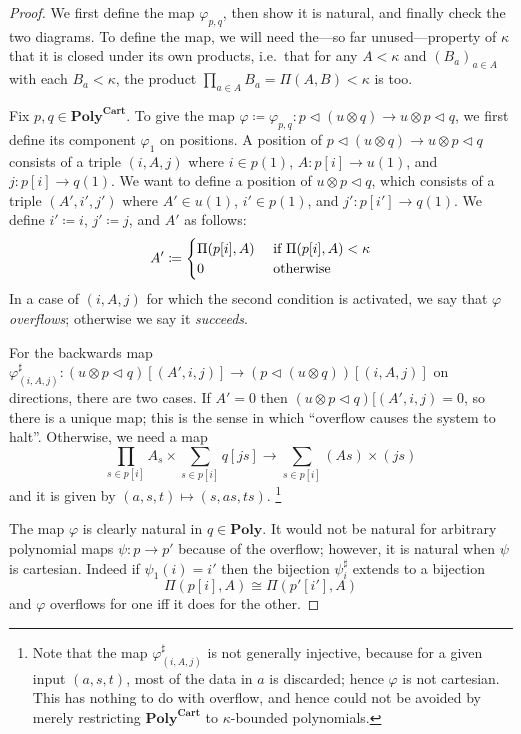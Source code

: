 \documentclass[11pt, one side, article]{memoir}
\theoremstyle{definition}
\theoremstyle{plain}
\newcommand{\Cat}[1]{\mathbf{#1}}%
\newcommand{\tn}[1]{\textnormal{#1}}
\newcommand{\poly}{\Cat{Poly}}
\newcommand{\polycart}{\poly^{\Cat{Cart}}}
\newcommand{\0}{\textsf{0}}
\newcommand{\1}{\tn{\textsf{1}}}
\newcommand{\tri}{\mathbin{\triangleleft}}
\begin{document}
\begin{proof}
We first define the map $\varphi_{p,q}$, then show it is natural, and finally check the two diagrams. To define the map, we will need the---so far unused---property of $\kappa$ that it is closed under its own products, i.e.\ that for any $A<\kappa$ and $(B_a)_{a\in A}$ with each $B_a<\kappa$, the product $\prod_{a\in A}B_a=\Pi(A,B)<\kappa$ is too.

Fix $p,q\in\polycart$. To give the map $\varphi\coloneqq\varphi_{p,q}\colon p\tri(u\otimes q)\to u\otimes p\tri q$, we first define its component $\varphi_1$ on positions. A position of $p\tri(u\otimes q)\to u\otimes p\tri q$ consists of a triple $(i,A,j)$ where $i\in p(1)$, $A\colon p[i]\to u(1)$, and $j\colon p[i]\to q(1)$. We want to define a position of $u\otimes p\tri q$, which consists of a triple $(A',i',j')$ where $A'\in u(1)$, $i'\in p(1)$, and $j'\colon p[i']\to q(1)$. We define $i'\coloneqq i$, $j'\coloneqq j$, and $A'$ as follows:
\begin{equation}\label{eqn.overflow}
  A'\coloneqq
  \begin{cases}
  	\Pi(p[i],A)&\tn{ if }\Pi(p[i],A)<\kappa\\
		0&\tn{ otherwise}
  \end{cases}
\end{equation}
In a case of $(i,A,j)$ for which the second condition is activated, we say that $\varphi$ \emph{overflows}; otherwise we say it \emph{succeeds}.

For the backwards map $\varphi^\sharp_{(i,A,j)}\colon (u\otimes p\tri q)[(A',i,j)]\to(p\tri(u\otimes q))[(i,A,j)]$ on directions, there are two cases. If $A'=0$ then $(u\otimes p\tri q)[(A',i,j)=0$, so there is a unique map; this is the sense in which ``overflow causes the system to halt''. Otherwise, we need a map
\begin{equation}\label{eqn.not_injective}
\prod_{s\in p[i]}A_s\times\sum_{s\in p[i]}q[js]\to\sum_{s\in p[i]}(A s)\times (js)
\end{equation}
and it is given by $(a,s,t)\mapsto(s,as,ts)$.%
\footnote{Note that the map $\varphi^\sharp_{(i,A,j)}$ is not generally injective, because for a given input $(a,s,t)$, most of the data in $a$ is discarded; hence $\varphi$ is not cartesian. This has nothing to do with overflow, and hence could not be avoided by merely restricting $\polycart$ to $\kappa$-bounded polynomials.}

The map $\varphi$ is clearly natural in $q\in\poly$. It would not be natural for arbitrary polynomial maps $\psi\colon p\to p'$ because of the overflow; however, it is natural when $\psi$ is cartesian. Indeed if $\psi_1(i)=i'$ then the bijection $\psi_i^\sharp$ extends to a bijection
\[\Pi(p[i],A)\cong\Pi(p'[i'],A)\]
and $\varphi$ overflows for one iff it does for the other.


\end{proof}
\end{document}
